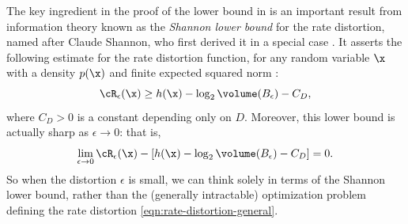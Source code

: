 \documentclass[../../book-main.tex]{subfiles}
\begin{document}
\begin{remark}\label{rem:slb}
	The key ingredient in the proof of the lower bound in
	 is an important result from
	information theory known as the \textit{Shannon lower bound} for the rate
	distortion, named after Claude Shannon, who first derived it in a special case
	\cite{shannon1959coding}. It
	asserts the following estimate for the rate distortion function, for any random
	variable $\x$ with
	a density $p(\x)$ and finite expected squared norm \cite{Linder1994-ej}:
	\begin{equation}\label{eq:slb}
		\cR_{\epsilon}(\x)
		\geq
		h(\x)
		- \log_2 \volume(B_{\epsilon})
		-
		C_D,
	\end{equation}
	where $C_D > 0$ is a constant depending only on $D$. Moreover, this lower bound
	is actually sharp as $\epsilon \to 0$: that is,
	\begin{equation}
		\lim_{\epsilon \to 0} \cR_{\epsilon}(\x) - \left[ h(\x) - \log_2
		\volume(B_{\epsilon}) - C_D\right] = 0.
	\end{equation}
	So when the distortion $\epsilon$ is small, we can think solely in terms of
	the Shannon lower bound, rather than the (generally intractable)
	optimization problem defining the rate distortion
	\eqref{eqn:rate-distortion-general}.


\end{remark}
\end{document}
